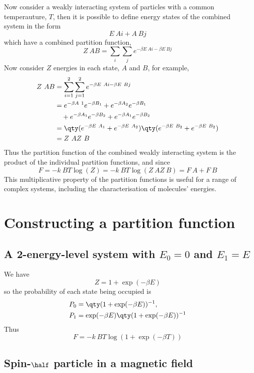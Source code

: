 Now consider a weakly interacting system of particles with a common
temperauture, $T$, then it is possible to define energy states of the
combined system in the form
\[ E~{Ai} + A~{Bj} \] which have a combined partition function,
\[ Z~{AB} = \sum_i \sum_j e^{- \beta E~{Ai} - \beta E~{Bj}} \] Now
consider $Z$ energies in each state, $A$ and $B$, for example,
\begin{align*}
  Z~{AB} &= \sum_{i=1}^2 \sum_{j=1}^2 e^{- \beta E~{Ai} - \beta E~{Bj}} \\
&= e^{-\beta A~1} e^{- \beta B_1} + e^{-\beta A_2} e^{-\beta B_1} \\ & \quad {}+ e^{-\beta A_1} e^{- \beta B_2} + e^{-\beta A_1}e^{-\beta B_2} \\
& = \qty( e^{-\beta E~A_1} + e^{-\beta E~{A_2}}) \qty( e^{-\beta E~{B_2}} + e^{-\beta E~{B_{2}}} ) \\ &= Z~A Z~B
\end{align*}
Thus the partition function of the combined weakly interacting system
is the product of the individual partition functions, and since
\begin{equation}
  \label{eq:22}
  F = - k~B T \log(Z) = -k~B T \log(Z~A Z~B) = F~A + F~B
\end{equation}
This multiplicative property of the partition functions is useful for
a range of complex systems, including the characterisation of
molecules' energies.

\section{Constructing a partition function}
\label{sec:constr-part-funct}

\subsection{A 2-energy-level system with $E_0=0$ and $E_1=E$	}
\label{sec:2-energy-level}

We have 
\[ Z = 1 + \exp(- \beta E) \] so the probability of each state being
occupied is
\begin{align*} P_0 &= \qty( 1+ \exp(-\beta E))^{-1}, \\ P_1 &= \exp(- \beta E) \qty( 1+ \exp(-\beta E))^{-1} \end{align*}
Thus
\[ F = -k~B T \log(1+ \exp(-\beta T)) \]

\subsection{Spin-$\half$ particle in a magnetic field}
\label{sec:spin-half-particle}

